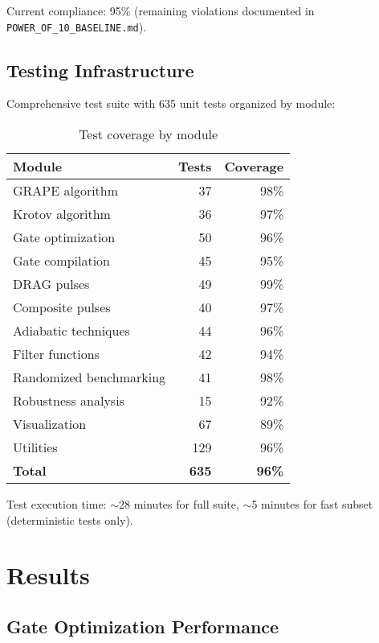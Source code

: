 \documentclass[11pt,a4paper]{article}
\theoremstyle{definition}
\theoremstyle{remark}
\begin{document}
Current compliance: 95\% (remaining violations documented in \texttt{POWER\_OF\_10\_BASELINE.md}).

\subsection{Testing Infrastructure}

Comprehensive test suite with 635 unit tests organized by module:

\begin{table}[h]
\centering
\begin{tabular}{lrr}
\toprule
\textbf{Module} & \textbf{Tests} & \textbf{Coverage} \\
\midrule
GRAPE algorithm & 37 & 98\% \\
Krotov algorithm & 36 & 97\% \\
Gate optimization & 50 & 96\% \\
Gate compilation & 45 & 95\% \\
DRAG pulses & 49 & 99\% \\
Composite pulses & 40 & 97\% \\
Adiabatic techniques & 44 & 96\% \\
Filter functions & 42 & 94\% \\
Randomized benchmarking & 41 & 98\% \\
Robustness analysis & 15 & 92\% \\
Visualization & 67 & 89\% \\
Utilities & 129 & 96\% \\
\midrule
\textbf{Total} & \textbf{635} & \textbf{96\%} \\
\bottomrule
\end{tabular}
\caption{Test coverage by module}
\end{table}

Test execution time: $\sim$28 minutes for full suite, $\sim$5 minutes for fast subset (deterministic tests only).

\section{Results}
\label{sec:results}

\subsection{Gate Optimization Performance}
\end{document}
